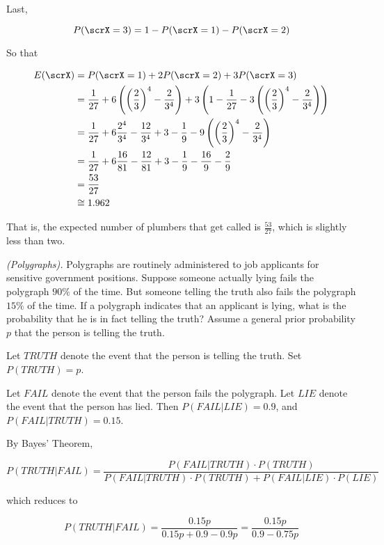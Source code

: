 \begin{solution}
Last,

\[
P(\scrX = 3) = 1-P(\scrX = 1)-P(\scrX = 2)
\]

So that

\begin{align*}
E(\scrX) &= P(\scrX=1) + 2P(\scrX=2) + 3P(\scrX = 3) \\
&= \frac{1}{27} + 6\left(\left(\frac{2}{3}\right)^4 - \frac{2}{3^4} \right) + 3\left(1-\frac{1}{27} -  3\left(\left(\frac{2}{3}\right)^4 - \frac{2}{3^4} \right)\right) \\
&= \frac{1}{27} + 6\frac{2^4}{3^4} - \frac{12}{3^4} + 3-\frac{1}{9} -  9\left(\left(\frac{2}{3}\right)^4 - \frac{2}{3^4} \right)\\
&= \frac{1}{27} + 6\frac{16}{81} - \frac{12}{81} + 3-\frac{1}{9} -  \frac{16}{9} - \frac{2}{9}\\
&= \frac{53}{27}\\
&\cong 1.962
\end{align*}

That is, the expected number of plumbers that get called is $\frac{53}{27}$, which is slightly less than two.

\end{solution}
\newpage

\begin{problem}[Handout 4, \# 7]
  \emph{(Polygraphs).} Polygraphs are routinely administered to job
  applicants for sensitive government positions. Suppose someone actually
  lying fails the polygraph \(90\%\) of the time. But someone telling the
  truth also fails the polygraph \(15\%\) of the time. If a polygraph
  indicates that an applicant is lying, what is the probability that he is
  in fact telling the truth? Assume a general prior probability \(p\) that
  the person is telling the truth.
\end{problem}
\begin{solution}

Let $TRUTH$ denote the event that the person is telling the truth. Set $P(TRUTH) = p$.

Let $FAIL$ denote the event that the person fails the polygraph. Let $LIE$ denote the event that the person has lied. Then $P(FAIL | LIE) = 0.9$, and $P(FAIL | TRUTH) = 0.15$.

By Bayes' Theorem,

\[
P(TRUTH | FAIL) = \frac{P(FAIL | TRUTH) \cdot P(TRUTH)}{P(FAIL | TRUTH) \cdot P(TRUTH) + P(FAIL | LIE) \cdot P(LIE)}
\]

which reduces to

\[
P(TRUTH | FAIL) = \frac{0.15p}{0.15p + 0.9 - 0.9p} = \frac{0.15p}{0.9 - 0.75p}
\]

\end{solution}
\newpage

